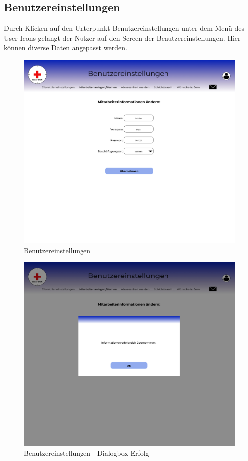 \documentclass[11pt,
paper=a4,
bibtotocnumbered,	  %
liststotocnumbered,  %
DIV=calc,		  %
tablecaptionabove,	  %
headinclude,
]{article}
\begin{document}
\subsection{Benutzereinstellungen}
Durch Klicken auf den Unterpunkt Benutzereinstellungen unter dem Menü des User-Icons gelangt der Nutzer auf den Screen der Benutzereinstellungen. Hier können diverse Daten angepasst werden.
\begin{figure}[H]
\includegraphics[width=1\textwidth]{Bilder/Screens/Benutzereinstellungen.jpg}{\centering}
\caption{Benutzereinstellungen}
\end{figure}
\begin{figure}[H]
\includegraphics[width=1\textwidth]{Bilder/Screens/Benutzereinstellungen(1).jpg}{\centering}
\caption{Benutzereinstellungen - Dialogbox Erfolg}
\end{figure}
\end{document}
